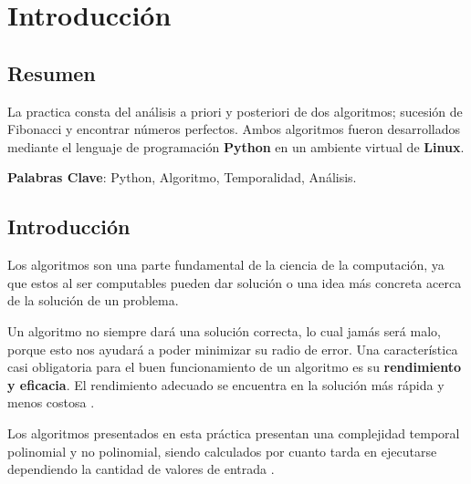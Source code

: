 
\chapter{Introducción}



\section{Resumen}
    La practica consta del análisis a priori y posteriori de dos algoritmos; sucesión de Fibonacci y encontrar números perfectos. Ambos algoritmos fueron desarrollados mediante el lenguaje de programación \textbf{Python} en un ambiente virtual de \textbf{Linux}.

    \textbf{Palabras Clave}: Python, Algoritmo, Temporalidad, Análisis.

\section{Introducción}
    Los algoritmos son una parte fundamental de la ciencia de la computación, ya que estos al ser computables pueden dar solución o una idea más concreta acerca de la solución de un problema.
    
    Un algoritmo no siempre dará una solución correcta, lo cual jamás será malo, porque esto nos ayudará a poder minimizar su radio de error. Una característica casi obligatoria para el buen funcionamiento de un algoritmo es su \textbf{rendimiento y eficacia}. El rendimiento adecuado se encuentra en la solución más rápida y menos costosa \cite{Algorithm}.
    
    Los algoritmos presentados en esta práctica presentan una complejidad temporal polinomial y no polinomial, siendo calculados por cuanto tarda en ejecutarse dependiendo la cantidad de valores de entrada \cite{CTemp}.
